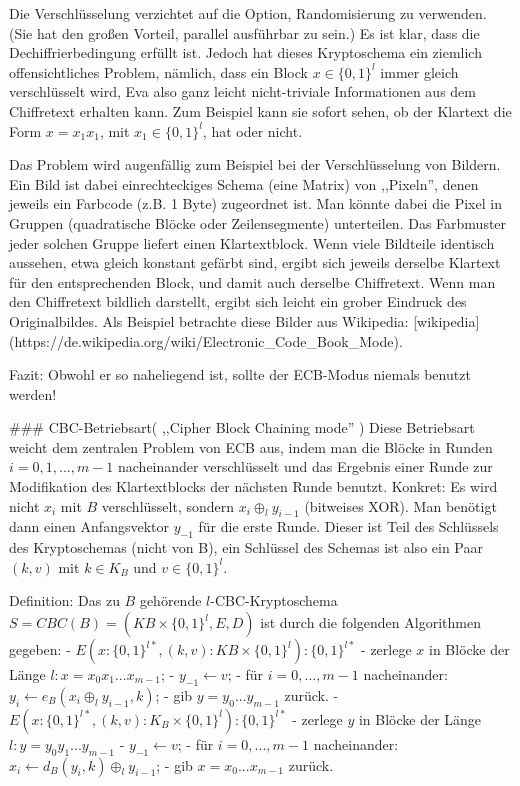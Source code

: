 \documentclass[a4paper]{article}
\begin{document}
\begin{multicols}{3}
Die Verschlüsselung verzichtet auf die Option, Randomisierung zu verwenden. (Sie hat den großen Vorteil, parallel ausführbar zu sein.) Es ist klar, dass die Dechiffrierbedingung erfüllt ist. Jedoch hat dieses Kryptoschema ein ziemlich offensichtliches Problem, nämlich, 
dass ein Block $x\in\{0,1\}^l$ immer gleich verschlüsselt wird, Eva also ganz leicht nicht-triviale Informationen aus dem Chiffretext erhalten kann. Zum Beispiel kann sie sofort sehen, ob der Klartext die Form $x=x_1 x_1$, mit $x_1\in\{0,1\}^l$, hat oder nicht.

Das Problem wird augenfällig zum Beispiel bei der Verschlüsselung von Bildern. Ein Bild ist dabei einrechteckiges Schema (eine Matrix) von ,,Pixeln'', denen jeweils ein Farbcode (z.B. 1 Byte) zugeordnet ist. Man könnte dabei die Pixel in Gruppen (quadratische Blöcke oder Zeilensegmente) unterteilen. Das Farbmuster jeder solchen Gruppe liefert einen Klartextblock. Wenn viele Bildteile identisch aussehen, etwa gleich konstant gefärbt sind, ergibt sich jeweils derselbe Klartext für den entsprechenden Block, und damit auch derselbe Chiffretext. Wenn man den Chiffretext bildlich darstellt, ergibt sich leicht ein grober Eindruck des Originalbildes. Als Beispiel betrachte diese Bilder aus Wikipedia: [wikipedia](https://de.wikipedia.org/wiki/Electronic_Code_Book_Mode).

Fazit: Obwohl er so naheliegend ist, sollte der ECB-Modus niemals benutzt werden!

### CBC-Betriebsart( ,,Cipher Block Chaining mode'' )
Diese Betriebsart weicht dem zentralen Problem von ECB aus, indem man die Blöcke in Runden $i=0, 1 ,...,m-1$ nacheinander verschlüsselt und das Ergebnis einer Runde zur Modifikation des Klartextblocks der nächsten Runde benutzt. Konkret: Es wird nicht $x_i$ mit $B$ verschlüsselt, sondern $x_i\oplus_l y_{i-1}$ (bitweises XOR). Man benötigt dann einen Anfangsvektor $y_{-1}$ für die erste Runde. Dieser ist Teil des Schlüssels des Kryptoschemas (nicht von B), ein Schlüssel des Schemas ist also ein Paar $(k,v)$ mit $k\in K_B$ und $v\in\{0,1\}^l$.

Definition: Das zu $B$ gehörende $l$-CBC-Kryptoschema $S=CBC(B)=(KB\times\{0,1\}^l,E,D)$ ist durch die folgenden Algorithmen gegeben:
- $E(x:\{0,1\}^{l*},(k,v) :KB\times\{0,1\}^l) :\{0,1\}^{l*}$
    - zerlege $x$ in Blöcke der Länge $l:x=x_0 x_1 ...x_{m-1}$;
    - $y_{-1} \leftarrow v$;
    - für $i= 0,...,m-1$ nacheinander: $y_i\leftarrow e_B(x_i\oplus_l y_{i-1},k)$;
    - gib $y=y_0 ...y_{m-1}$ zurück.
- $E(x:\{0,1\}^{l*},(k,v) :K_B\times\{0,1\}^l) :\{0,1\}^{l*}$
    - zerlege $y$ in Blöcke der Länge $l:y=y_0 y_1 ...y_{m-1}$
    - $y_{-1} \leftarrow v$;
    - für $i=0,...,m-1$ nacheinander: $x_i\leftarrow d_B(y_i,k)\oplus_l y_{i-1}$;
    - gib $x=x_0 ...x_{m-1}$ zurück.


\end{multicols}
\end{document}
